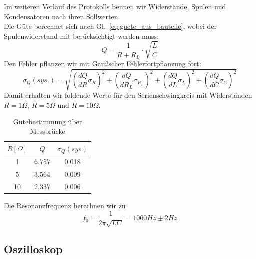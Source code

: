 \documentclass[12pt,a4paper]{article}
\begin{document}
Im weiteren Verlauf des Protokolls bennen wir Widerstände, Spulen und Kondensatoren nach ihren Sollwerten.\\
Die Güte berechnet sich nach Gl.~\eqref{eq:guete_aus_bauteile}, wobei der Spulenwiderstand mit berücksichtigt werden muss:
\begin{equation}
Q=\frac{1}{R+R_L}\cdot \sqrt{\frac{L}{C}}
\end{equation}
Den Fehler pflanzen wir mit Gaußscher Fehlerfortpflanzung fort:
\begin{equation}
\sigma_Q(sys.)=\sqrt{\left(\frac{dQ}{dR}\sigma_R\right)^2+\left(\frac{dQ}{dR_L}\sigma_{R_L}\right)^2+\left(\frac{dQ}{dL}\sigma_L\right)^2+\left(\frac{dQ}{dC}\sigma_C\right)^2}
\end{equation}
Damit erhalten wir foldende Werte für den Serienschwingkreis mit Widerständen $R=1\Omega$, $R=5\Omega$ und $R=10\Omega$.
\begin{table}[H]
	\centering
	\begin{tabular}{|c|c|c|}
		\hline
		$R[\Omega]$&$Q$&$\sigma_Q(sys)$\\
		\hline
		1&6.757&0.018\\
		5&3.564&0.009\\
		10&2.337&0.006\\
		\hline
	\end{tabular}
	\caption{Gütebestimmung über Messbrücke}
	\label{table:guete_messbruecke}
\end{table}
Die Resonanzfrequenz berechnen wir zu
\begin{equation}
f_0=\frac{1}{2\pi\sqrt{LC}}=1060Hz\pm 2Hz
\end{equation}
		
\subsection{Oszilloskop}
\end{document}
